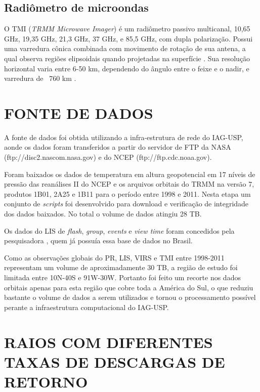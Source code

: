\subsection{Radiômetro de microondas}

O TMI (\textit{TRMM Microwave Imager}) é um radiômetro passivo multicanal, 10,65 GHz, 19,35 GHz, 21,3 GHz, 37 GHz, e 85,5 GHz, com dupla polarização. Possui uma varredura cônica combinada com movimento de rotação de sua antena, a qual observa regiões elipsoidais quando projetadas na superfície \cite{kummerok1998}. Sua resolução horizontal varia entre 6-50 km, dependendo do ângulo entre o feixe e o nadir, e varredura de ~760 km \cite{trmmhandbook}. 

\section{FONTE DE DADOS}

A fonte de dados foi obtida utilizando a infra-estrutura de rede do IAG-USP, aonde os dados foram transferidos a partir do servidor de FTP da NASA (ftp://disc2.nascom.nasa.gov) e do NCEP (ftp://ftp.cdc.noaa.gov).


Foram baixados os dados de temperatura em altura geopotencial em 17 níveis de pressão das reanálises II do NCEP e os arquivos orbitais do TRMM na versão 7, produtos 1B01, 2A25 e 1B11  para o período entre 1998 e 2011. Nesta etapa um conjunto de \textit{scripts} foi desenvolvido para download e verificação de integridade dos dados baixados. No total o volume de dados atingiu 28 TB.  %

Os dados do LIS de \textit{flash}, \textit{group}, \textit{events} e \textit{view time} foram concedidos pela pesquisadora , quem já possuía essa base de dados no Brasil. 

Como as observações globais do PR, LIS, VIRS e TMI entre 1998-2011 representam um volume de aproximadamente 30 TB, a região de estudo foi limitada entre 10N-40S e 91W-30W. Portanto foi feito um recorte nos dados orbitais apenas para esta região que cobre toda a América do Sul, o que reduziu bastante o volume de dados a serem utilizados e tornou o processamento possível perante a infraestrutura computacional do IAG-USP.

\section{RAIOS COM DIFERENTES TAXAS DE DESCARGAS DE RETORNO}

